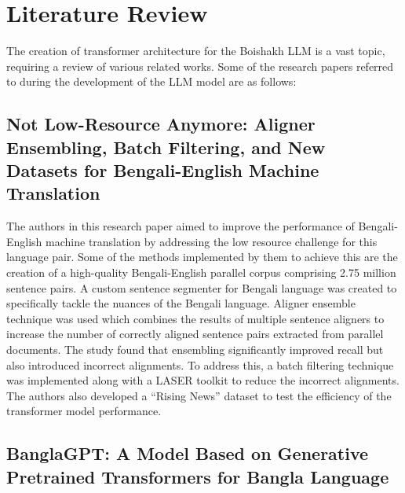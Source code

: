 \section{Literature Review}

The creation of transformer architecture for the Boishakh LLM is a vast topic, requiring a review of various related works. Some of the research papers referred to during the development of the LLM model are as follows:

\subsection{Not Low-Resource Anymore: Aligner Ensembling, Batch Filtering, and New Datasets for Bengali-English Machine Translation}

The authors in this research paper aimed to improve the performance of Bengali-English machine translation by addressing the low resource challenge for this language pair. Some of the methods implemented by them to achieve this are the creation of a high-quality Bengali-English parallel corpus comprising 2.75 million sentence pairs. A custom sentence segmenter for Bengali language was created to specifically tackle the nuances of the Bengali language. Aligner ensemble technique was used which combines the results of multiple sentence aligners to increase the number of correctly aligned sentence pairs extracted from parallel documents. The study found that ensembling significantly improved recall but also introduced incorrect alignments. To address this, a batch filtering technique was implemented along with a LASER toolkit to reduce the incorrect alignments.\\
The authors also developed a “Rising News” dataset to test the efficiency of the transformer model performance.

\subsection{BanglaGPT: A Model Based on Generative Pretrained Transformers for Bangla Language}

